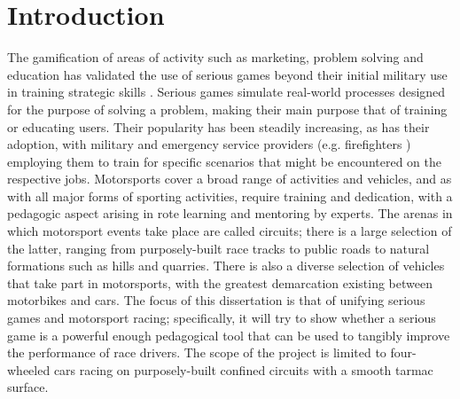 \chapter{Introduction}

The gamification of areas of activity such as marketing, problem solving and education \cite{michael2005serious} has validated the use of serious games beyond their initial military use in training strategic skills \cite{djaouti2011classifying}.  Serious games simulate real-world processes designed for the purpose of solving a problem, making their main purpose that of training or educating users. Their popularity has been steadily increasing, as has their adoption, with military \cite{djaouti2011classifying} and emergency service providers (e.g. firefighters \cite{michael2005serious}) employing them to train for specific scenarios that might be encountered on the respective jobs. Motorsports cover a broad range of activities and vehicles, and as with all major forms of sporting activities, require training and dedication, with a pedagogic aspect arising in rote learning and mentoring by experts. The arenas in which motorsport events take place are called circuits; there is a large selection of the latter, ranging from purposely-built race tracks to public roads to natural formations such as hills and quarries. There is also a diverse selection of vehicles that take part in motorsports, with the greatest demarcation existing between motorbikes and cars. The focus of this dissertation is that of unifying serious games and motorsport racing; specifically, it will try to show whether a serious game is a powerful enough pedagogical tool that can be used to tangibly improve the performance of race drivers. The scope of the project is limited to four-wheeled cars racing on purposely-built confined circuits with a smooth tarmac surface.  


